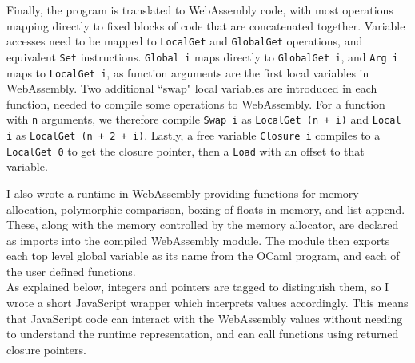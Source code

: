 Finally, the program is translated to WebAssembly code, with most operations mapping directly to fixed blocks of code that are concatenated together. Variable accesses need to be mapped to \verb|LocalGet| and \verb|GlobalGet| operations, and equivalent \verb|Set| instructions. \verb|Global i| maps directly to \verb|GlobalGet i|, and \verb|Arg i| maps to \verb|LocalGet i|, as function arguments are the first local variables in WebAssembly. Two additional ``swap" local variables are introduced in each function, needed to compile some operations to WebAssembly. For a function with \verb|n| arguments, we therefore compile \verb|Swap i| as \verb|LocalGet (n + i)| and \verb|Local i| as \verb|LocalGet (n + 2 + i)|. Lastly,  a free variable \verb|Closure i| compiles to a \verb|LocalGet 0| to get the closure pointer, then a \verb|Load| with an offset to that variable.



I also wrote a runtime in WebAssembly providing functions for memory allocation, polymorphic comparison, boxing of floats in memory, and list append. These, along with the memory controlled by the memory allocator, are declared as imports into the compiled WebAssembly module. The module then exports each top level global variable as its name from the OCaml program, and each of the user defined functions. \\
As explained below, integers and pointers are tagged to distinguish them, so I wrote a short JavaScript wrapper which interprets values accordingly. This means that JavaScript code can interact with the WebAssembly values without needing to understand the runtime representation, and can call functions using returned closure pointers.

